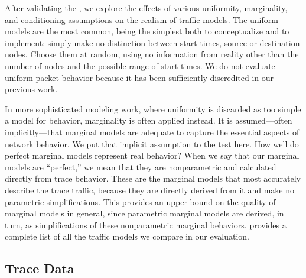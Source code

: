 \documentclass[twocolumn,final]{svjour3}
\begin{document}
After validating the , we explore the effects of various uniformity, marginality, and conditioning assumptions on the realism of traffic models. The uniform models are the most common, being the simplest both to conceptualize and to implement: simply make no distinction between start times, source or destination nodes. Choose them at random, using no information from reality other than the number of nodes and the possible range of start times. We do not evaluate uniform packet behavior because it has been sufficiently discredited in our previous work.

In more sophisticated modeling work, where uniformity is discarded as too simple a model for behavior, marginality is often applied instead. It is assumed---often implicitly---that marginal models are adequate to capture the essential aspects of network behavior. We put that implicit assumption to the test here. How well do perfect marginal models represent real behavior? When we say that our marginal models are ``perfect,'' we mean that they are nonparametric and calculated directly from trace behavior. These are the marginal models that most accurately describe the trace traffic, because they are directly derived from it and make no parametric simplifications. This provides an upper bound on the quality of marginal models in general, since parametric marginal models are derived, in turn, as simplifications of these nonparametric marginal behaviors.  provides a complete list of all the traffic models we compare in our evaluation.


\subsection{Trace Data}\label{sec:trace-data}
\end{document}
